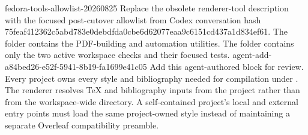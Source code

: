 \agentProposedEdit
  {fedora-tools-allowlist-20260825}
  {Replace the obsolete renderer-tool description with the focused post-cutover allowlist from Codex conversation hash 75feaf412362c5abd783e0debdfda0cbe6d62077eaa9c6151cd437a1d834ef61.}
  {The  folder contains the PDF-building and automation utilities.}
  {The  folder contains only the two active workspace checks and their focused tests.}
\agentProposedEdit
  {agent-add-a84bed26-e52f-5941-8b19-fa1699e41c05}
  {Add this agent-authored block for review.}
  {}
  {Every project owns every style and bibliography needed for compilation under .
The renderer resolves TeX and bibliography inputs from the project rather than from the workspace-wide  directory.
A self-contained project's local and external entry points must load the same project-owned style instead of maintaining a separate Overleaf compatibility preamble.}

